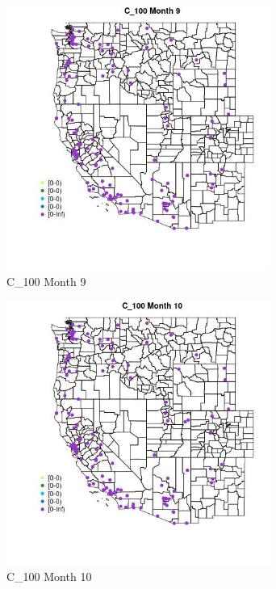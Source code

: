 \begin{figure} 
\centering  
\includegraphics[width=0.77\textwidth]{Code_Outputs/Report_ML_input_PM25_Step4_part_e_de_duplicated_aves_MapObsMo9C_100.jpg} 
\caption{\label{fig:Report_ML_input_PM25_Step4_part_e_de_duplicated_avesMapObsMo9C_100}C_100 Month 9} 
\end{figure} 
 

\begin{figure} 
\centering  
\includegraphics[width=0.77\textwidth]{Code_Outputs/Report_ML_input_PM25_Step4_part_e_de_duplicated_aves_MapObsMo10C_100.jpg} 
\caption{\label{fig:Report_ML_input_PM25_Step4_part_e_de_duplicated_avesMapObsMo10C_100}C_100 Month 10} 
\end{figure} 
 

